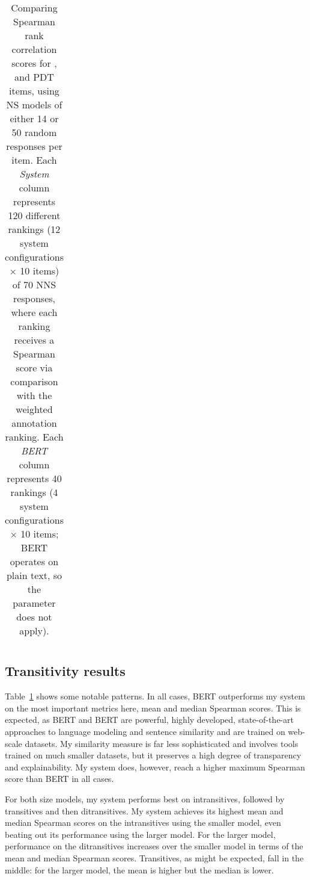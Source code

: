 \begin{table}[htb!]
\begin{center}
\begin{tabular}{|l||l|l||l|l||l|l|}
\hline
\end{tabular}
\caption{\label{tab:transitivity-results} Comparing Spearman rank correlation scores for ,  and  PDT items, using NS models of either 14 or 50 random responses per item. Each \textit{System} column represents 120 different rankings (12 system configurations $\times$ 10 items) of 70 NNS responses, where each ranking receives a Spearman score via comparison with the weighted annotation ranking. Each \textit{BERT} column represents 40 rankings (4 system configurations $\times$ 10 items; BERT operates on plain text, so the  parameter does not apply).
}
\end{center}
\end{table}



\subsection{Transitivity results}
\label{sec:transitivity-results}
Table~\ref{tab:transitivity-results} shows some notable patterns. In all cases, BERT outperforms my system on the most important metrics here, mean and median Spearman scores. This is expected, as BERT and BERT are powerful, highly developed, state-of-the-art approaches to language modeling and sentence similarity and are trained on web-scale datasets. My similarity measure is far less sophisticated and involves tools trained on much smaller datasets, but it preserves a high degree of transparency and explainability. My system does, however, reach a higher maximum Spearman score than BERT in all cases.

For both size models, my system performs best on intransitives, followed by transitives and then ditransitives. My system achieves its highest mean and median Spearman scores on the intransitives using the smaller model, even beating out its performance using the larger model. For the larger model, performance on the ditransitives increases over the smaller model in terms of the mean and median Spearman scores. Transitives, as might be expected, fall in the middle: for the larger model, the mean is higher but the median is lower.

